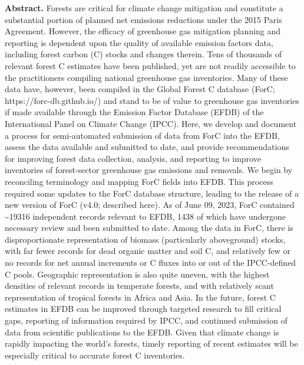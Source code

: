 \documentclass[, manuscript]{copernicus}
\begin{document}
\textbf{Abstract.} Forests are critical for climate change mitigation
and constitute a substantial portion of planned net emissions reductions
under the 2015 Paris Agreement. However, the efficacy of greenhouse gas
mitigation planning and reporting is dependent upon the quality of
available emission factors data, including forest carbon (C) stocks and
changes therein. Tens of thousands of relevant forest C estimates have
been published, yet are not readily accessible to the practitioners
compiling national greenhouse gas inventories. Many of these data have,
however, been compiled in the Global Forest C database (ForC;
https://forc-db.github.io/) and stand to be of value to greenhouse gas
inventories if made available through the Emission Factor Database
(EFDB) of the International Panel on Climate Change (IPCC). Here, we
develop and document a process for semi-automated submission of data
from ForC into the EFDB, assess the data available and submitted to
date, and provide recommendations for improving forest data collection,
analysis, and reporting to improve inventories of forest-sector
greenhouse gas emissions and removals. We begin by reconciling
terminology and mapping ForC fields into EFDB. This process required
some updates to the ForC database structure, leading to the release of a
new version of ForC (v4.0; described here). As of June 09, 2023, ForC
contained \textasciitilde19316 independent records relevant to EFDB,
1438 of which have undergone necessary review and been submitted to
date. Among the data in ForC, there is disproportionate representation
of biomass (particularly aboveground) stocks, with far fewer records for
dead organic matter and soil C, and relatively few or no records for net
annual increments or C fluxes into or out of the IPCC-defined C pools.
Geographic representation is also quite uneven, with the highest
densities of relevant records in temperate forests, and with relatively
scant representation of tropical forests in Africa and Asia. In the
future, forest C estimates in EFDB can be improved through targeted
research to fill critical gaps, reporting of information required by
IPCC, and continued submission of data from scientific publications to
the EFDB. Given that climate change is rapidly impacting the world's
forests, timely reporting of recent estimates will be especially
critical to accurate forest C inventories.

\introduction[Introduction]
\end{document}
